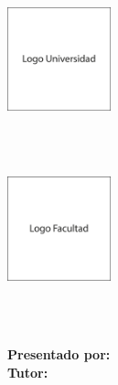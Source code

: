 \begin{titlepage}
    \begin{minipage}{2.7cm}
        \begin{center}
            \includegraphics[width=3cm,height=3cm]{img/logo_universidad.png}
        \end{center}
    \end{minipage}
    \hfill
    \begin{minipage}{11cm}
        \begin{center}
            \large{ \textbf{\MakeUppercase{\nombreUniversidad}} }\\
            \normalsize{ \textbf{\MakeUppercase{\nombreFacultad}} }\\
            \small{ \textbf{\MakeUppercase{\nombreCarrera}} }
        \end{center}
    \end{minipage}
    \hfill
    \begin{minipage}{3.0cm}
        \begin{center}
            \includegraphics[width=3.0cm,height=3.0cm]{img/logo_facultad.png}
        \end{center}
    \end{minipage}
    \vspace{5cm}\\
    \begin{center}
        \MakeUppercase{\nombreProyecto}
    \end{center}
    \vspace{4cm}
    \descripcion\\

    \vspace{2cm}
    \textnormal{\textbf{Presentado por:} \nombreAutor}\\

    \vspace{0.3cm}
    \textnormal{\textbf{Tutor:} \nombreTutor}\\

    \vspace{3.5cm}
    \begin{center}
        \textbf{\MakeUppercase{\nombreCiudadPais}}\\
        \fecha
    \end{center}
\end{titlepage}
\restoregeometry